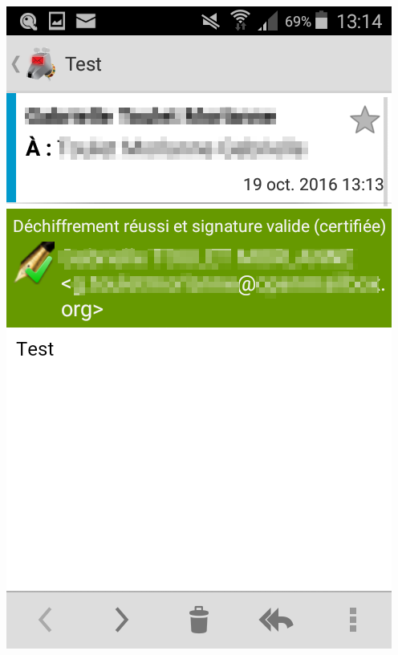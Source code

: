 \documentclass{beamer}
\begin{document}
\begin{frame}
\begin{minipage}{0.4\textwidth}
    	\includegraphics[keepaspectratio, scale=0.25]{figures/K92.png}
\end{minipage}
\end{frame}
\end{document}
